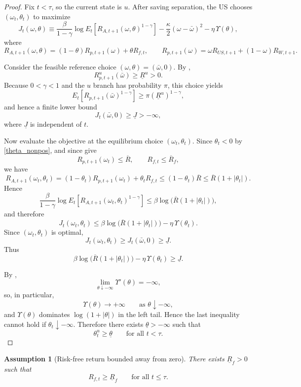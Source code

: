 \documentclass[12pt]{article}
\theoremstyle{plain}
\newtheorem{ass}{Assumption}
\begin{document}
\begin{proof}
Fix $t<\tau$, so the current state is $u$. After saving separation, the US chooses $(\omega_t,\theta_t)$ to maximize
\[
J_t(\omega,\theta)
\equiv
\frac{\beta}{1-\gamma}\log E_t\!\left[R_{A,t+1}(\omega,\theta)^{1-\gamma}\right]
-\frac{\kappa}{2}(\omega-\bar\omega)^2
-\eta\,\Upsilon(\theta),
\]
where
\[
R_{A,t+1}(\omega,\theta)
=
(1-\theta)R_{p,t+1}(\omega)+\theta R_{f,t},
\qquad
R_{p,t+1}(\omega)=\omega R_{US,t+1}+(1-\omega)R_{W,t+1}.
\]

Consider the feasible reference choice $(\omega,\theta)=(\bar\omega,0)$. By ,
\[
R^u_{p,t+1}(\bar\omega) \ge \underline R^u >0.
\]
Because $0<\gamma<1$ and the $u$ branch has probability $\pi$, this choice
yields
\[
E_t\!\left[R_{p,t+1}(\bar\omega)^{1-\gamma}\right]
\ge
\pi(\underline R^u)^{1-\gamma},
\]
and hence a finite lower bound
\[
J_t(\bar\omega,0)\ge \underline J>-\infty,
\]
where $\underline J$ is independent of $t$.

Now evaluate the objective at the equilibrium choice $(\omega_t,\theta_t)$. Since $\theta_t<0$ by
\eqref{theta_nonpos}, and since  give
\[
R_{p,t+1}(\omega_t)\le \overline R,
\qquad
R_{f,t}\le \overline R_f,
\]
we have
\[
R_{A,t+1}(\omega_t,\theta_t)
=
(1-\theta_t)R_{p,t+1}(\omega_t)+\theta_t R_{f,t}
\le
(1-\theta_t)\overline R
\le
\overline R(1+|\theta_t|).
\]
Hence
\[
\frac{\beta}{1-\gamma}\log E_t\!\left[R_{A,t+1}(\omega_t,\theta_t)^{1-\gamma}\right]
\le
\beta\log\!\bigl(\overline R(1+|\theta_t|)\bigr),
\]
and therefore
\[
J_t(\omega_t,\theta_t)
\le
\beta\log\!\bigl(\overline R(1+|\theta_t|)\bigr)-\eta\,\Upsilon(\theta_t).
\]
Since $(\omega_t,\theta_t)$ is optimal,
\[
J_t(\omega_t,\theta_t)\ge J_t(\bar\omega,0)\ge \underline J.
\]
Thus
\[
\beta\log\!\bigl(\overline R(1+|\theta_t|)\bigr)-\eta\,\Upsilon(\theta_t)\ge \underline J.
\]

By ,
\[
\lim_{\theta\downarrow -\infty}\Upsilon'(\theta)=-\infty,
\]
so, in particular,
\[
\Upsilon(\theta)\to+\infty
\qquad\text{as }\theta\downarrow -\infty,
\]
and $\Upsilon(\theta)$ dominates $\log(1+|\theta|)$ in the left tail. Hence the last inequality cannot hold if
$\theta_t\downarrow -\infty$. Therefore there exists $\underline\theta>-\infty$ such that
\[
\theta_t^u\ge \underline\theta
\qquad\text{for all }t<\tau.
\]
\end{proof}


\begin{ass}[Risk-free return bounded away from zero]\label{ass_rf_lower_bound}
There exists $\underline R_f>0$ such that
$$
R_{f,t}\ge \underline R_f
\qquad\text{for all }t\le \tau.
$$
\end{ass}
\end{document}
